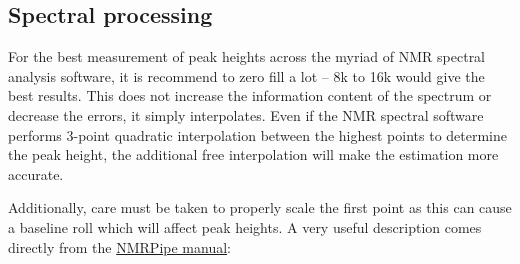 
\subsection{Spectral processing}

For the best measurement of peak heights across the myriad of NMR spectral analysis software, it is recommend to zero fill a lot -- 8k to 16k would give the best results.  This does not increase the information content of the spectrum or decrease the errors, it simply interpolates.  Even if the NMR spectral software performs 3-point quadratic interpolation between the highest points to determine the peak height, the additional free interpolation will make the estimation more accurate.

Additionally, care must be taken to properly scale the first point as this can cause a baseline roll which will affect peak heights.  A very useful description comes directly from the \href{http://spin.niddk.nih.gov/NMRPipe/doc1/}{NMRPipe manual}:


